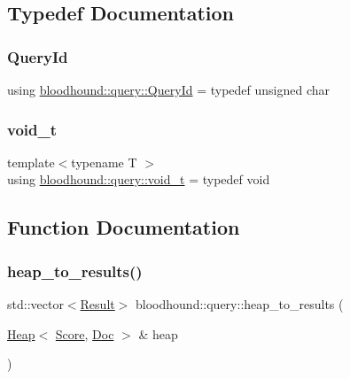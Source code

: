 \subsection{Typedef Documentation}
\mbox{\label{namespacebloodhound_1_1query_aa67214af106292b2483995adea986b08}} 
\subsubsection{\texorpdfstring{Query\+Id}{QueryId}}
{\footnotesize\ttfamily using \hyperlink{namespacebloodhound_1_1query_aa67214af106292b2483995adea986b08}{bloodhound\+::query\+::\+Query\+Id} = typedef unsigned char}

\mbox{\label{namespacebloodhound_1_1query_afd658a38b784a8187f8782905cb901e6}} 
\subsubsection{\texorpdfstring{void\+\_\+t}{void\_t}}
{\footnotesize\ttfamily template$<$typename T $>$ \\
using \hyperlink{namespacebloodhound_1_1query_afd658a38b784a8187f8782905cb901e6}{bloodhound\+::query\+::void\+\_\+t} = typedef void}



\subsection{Function Documentation}
\mbox{\label{namespacebloodhound_1_1query_a5a5bc223989deaa8a8d01f86ede9252c}} 
\subsubsection{\texorpdfstring{heap\+\_\+to\+\_\+results()}{heap\_to\_results()}}
{\footnotesize\ttfamily std\+::vector$<$\hyperlink{structbloodhound_1_1query_1_1Result}{Result}$>$ bloodhound\+::query\+::heap\+\_\+to\+\_\+results (\begin{DoxyParamCaption}\item[{\hyperlink{classbloodhound_1_1Heap}{Heap}$<$ \hyperlink{structbloodhound_1_1Score}{Score}, \hyperlink{structbloodhound_1_1Doc}{Doc} $>$ \&}]{heap }\end{DoxyParamCaption})}




